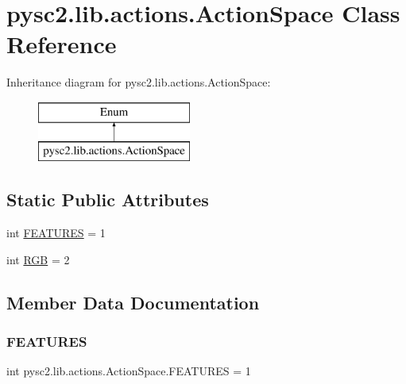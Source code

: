 \hypertarget{classpysc2_1_1lib_1_1actions_1_1_action_space}{}\section{pysc2.\+lib.\+actions.\+Action\+Space Class Reference}
\label{classpysc2_1_1lib_1_1actions_1_1_action_space}
Inheritance diagram for pysc2.\+lib.\+actions.\+Action\+Space\+:\begin{figure}[H]
\begin{center}
\leavevmode
\includegraphics[height=2.000000cm]{classpysc2_1_1lib_1_1actions_1_1_action_space}
\end{center}
\end{figure}
\subsection*{Static Public Attributes}
\begin{DoxyCompactItemize}
\item 
int \mbox{\hyperlink{classpysc2_1_1lib_1_1actions_1_1_action_space_ac436954d571bb283b841d031f3805010}{F\+E\+A\+T\+U\+R\+ES}} = 1
\item 
int \mbox{\hyperlink{classpysc2_1_1lib_1_1actions_1_1_action_space_a4f7698070ca8cdf94697061cb83ad78a}{R\+GB}} = 2
\end{DoxyCompactItemize}


\subsection{Member Data Documentation}
\mbox{\label{classpysc2_1_1lib_1_1actions_1_1_action_space_ac436954d571bb283b841d031f3805010}} 
\subsubsection{\texorpdfstring{F\+E\+A\+T\+U\+R\+ES}{FEATURES}}
{\footnotesize\ttfamily int pysc2.\+lib.\+actions.\+Action\+Space.\+F\+E\+A\+T\+U\+R\+ES = 1\hspace{0.3cm}{\ttfamily [static]}}

